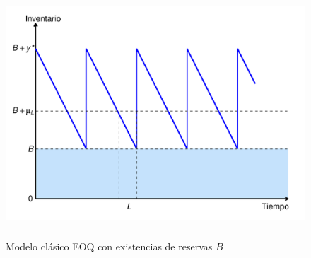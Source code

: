 \begin{figure}[H]
  \caption{Modelo clásico EOQ con existencias de reservas $B$}
  {\includegraphics[width=15cm, height=8.5cm]{images/EOQ_ext.pdf}}
  \label{fig:EOQ_ext}
\end{figure} 

